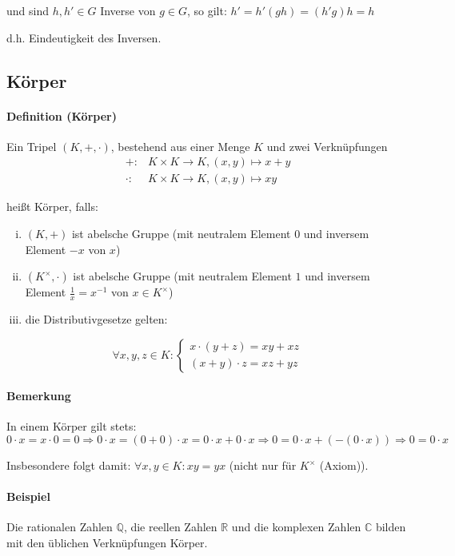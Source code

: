 	und sind $h,h'\in G$ Inverse von $g\in G$, so gilt:\hfill
	$ h' = h'(gh) = (h'g)h = h $

	
	d.h. Eindeutigkeit des Inversen.

\subsection{Körper}
\paragraph{Definition (Körper)}
	Ein Tripel $(K,+,\cdot)$, bestehend aus einer Menge $K$ und zwei Verknüpfungen
	\begin{align*}
		+:&K\times K\to K,(x,y)\mapsto x+y\\
		\cdot : &K\times K\to K, (x,y)\mapsto xy
	\end{align*}
	
	heißt Körper, falls:
	\begin{enumerate}[(i)]
		\item $(K,+)$ ist abelsche Gruppe (mit neutralem Element $0$ und inversem Element $-x$ von $x$)
		\item $(K^\times,\cdot)$ ist abelsche Gruppe (mit neutralem Element $1$ und inversem Element $\frac{1}{x} = x^{-1}$ von $x\in K^\times$)
		\item die Distributivgesetze gelten:
	\end{enumerate}
	
	\begin{equation*}
		\forall x,y,z\in K :\begin{cases}x\cdot (y+z) = xy+xz\\ (x+y)\cdot z = xz+yz \end{cases}
	\end{equation*}

\paragraph{Bemerkung}
	In einem Körper gilt stets:
	\begin{equation*}
		0\cdot x = x\cdot 0 = 0 \Rightarrow
		0\cdot x = (0+0)\cdot x = 0\cdot x + 0\cdot x \Rightarrow
		0 = 0\cdot x + (-(0\cdot x)) \Rightarrow 0 = 0\cdot x
	\end{equation*}
	
	Insbesondere folgt damit: $\forall x,y\in K: xy = yx$ (nicht nur für $K^\times$ (Axiom)).
\paragraph{Beispiel}
	Die rationalen Zahlen $\mathbb{Q}$, die reellen Zahlen $\mathbb{R}$ und die komplexen Zahlen $\mathbb{C}$ bilden mit den üblichen Verknüpfungen Körper.

